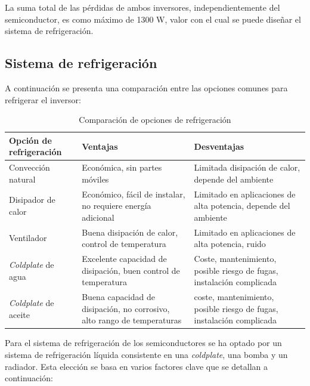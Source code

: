 La suma total de las pérdidas de ambos inversores, independientemente del semiconductor, es como máximo de 1300 W, valor con el cual se puede diseñar el sistema de refrigeración.

\subsection{Sistema de refrigeración}

A continuación se presenta una comparación entre las opciones comunes para refrigerar el inversor:

\begin{table}[H]
	\centering
	\begin{tabular}{|p{2.5cm}|p{5cm}|p{5cm}|}
		\hline
		\textbf{Opción de refrigeración} & \textbf{Ventajas} & \textbf{Desventajas} \\ \hline
		Convección natural & Económica, sin partes móviles & Limitada disipación de calor, depende del ambiente \\ \hline
		Disipador de calor & Económico, fácil de instalar, no requiere energía adicional & Limitado en aplicaciones de alta potencia, depende del ambiente \\ \hline
		Ventilador & Buena disipación de calor, control de temperatura & Limitado en aplicaciones de alta potencia, ruido \\ \hline
		\textit{Coldplate} de agua & Excelente capacidad de disipación, buen control de temperatura & Coste, mantenimiento, posible riesgo de fugas, instalación complicada \\ \hline
		\textit{Coldplate} de aceite & Buena capacidad de disipación, no corrosivo, alto rango de temperaturas &  coste, mantenimiento, posible riesgo de fugas, instalación complicada \\ \hline
	\end{tabular}
	\caption{Comparación de opciones de refrigeración}
\end{table}



Para el sistema de refrigeración de los semiconductores se ha optado por un sistema de refrigeración líquida consistente en una \textit{coldplate}, una bomba y un radiador. Esta elección se basa en varios factores clave que se detallan a continuación:

